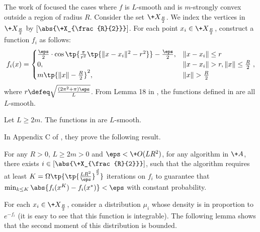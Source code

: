 The work of \cite{MCJ+19} focused the cases where $f$ is $L$-smooth and is $m$-strongly convex outside a region of radius $R$. Consider the set $\+X_{\frac{R}{2}}$. We index the vertices in $\+X_{\frac{R}{2}}$ by $\left[\abs{\+X_{\frac{R}{2}}}\right]$. For each point $x_i\in \+X_{\frac{R}{2}}$, construct a function $f_i$ as follows:
\begin{equation}
    f_i(x) = \begin{cases}
        \frac{\eps}{2} \cdot \cos\tp{\frac{\pi}{r^2}\tp{\|x-x_i\|^2 - r^2}} - \frac{\eps}{2}, & \|x-x_i\|\leq r\\
        0, & \|x-x_i\|> r, \|x\| \leq \frac{R}{2} \\
        m\tp{\|x\| - \frac{R}{2}}^{2}, & \|x\|>\frac{R}{2}
    \end{cases}, \label{eq:opt1}
\end{equation}
where $r\defeq \sqrt{\frac{(2\pi^2 + \pi) \eps}{L}}$. 
From Lemma 18 in \cite{MCJ+19}, the functions defined in  are all $L$-smooth. 
\begin{lemma}\label{lem:opt-lb3}
    Let $L\geq 2m$. The functions in  are $L$-smooth.
\end{lemma}

In Appendix C of \cite{MCJ+19}, they prove the following result.
\begin{theorem}\label{thm:lb-opt}
    For any $R>0$, $L\geq 2m>0$ and $\eps<\+O(LR^2)$, for any algorithm in $\+A$, there exists $i\in \left[\abs{\+X_{\frac{R}{2}}}\right]$, such that the algorithm requires at least $K=\Omega\tp{\tp{\frac{LR^2}{\eps}}^{\frac{d}{2}}}$ iterations on $f_i$ to guarantee that $\min_{k\leq K} \abs{f_i(x^K) - f_i(x^*)}<\eps$ with constant probability.
\end{theorem}

For each $x_i\in \+X_{\frac{R}{2}}$, consider a distribution $\mu_i$ whose density is in proportion to $e^{-f_i}$ (it is easy to see that this function is integrable). The following lemma shows that the second moment of this distribution is bounded.


